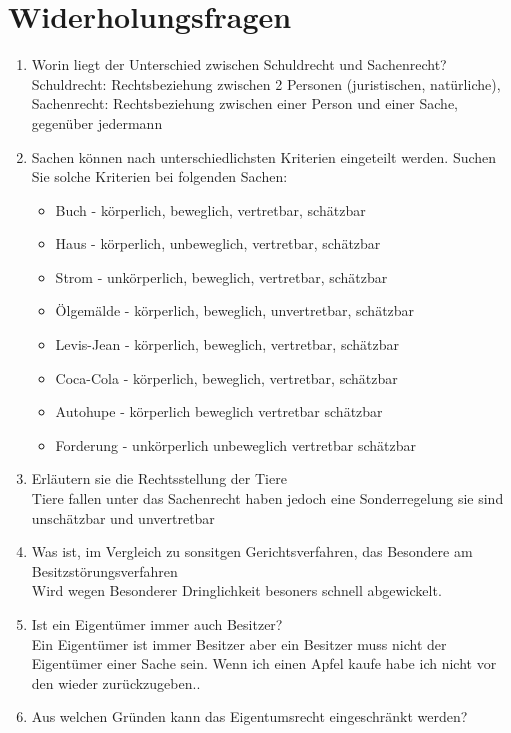 \documentclass[a4paper]{report}
\begin{document}
\section{Widerholungsfragen}
\begin{enumerate}
\item Worin liegt der Unterschied zwischen Schuldrecht und Sachenrecht?\\
Schuldrecht: Rechtsbeziehung zwischen 2 Personen (juristischen, natürliche), Sachenrecht: Rechtsbeziehung zwischen einer Person und einer Sache, gegenüber jedermann
\item Sachen können nach unterschiedlichsten Kriterien eingeteilt werden. Suchen Sie solche Kriterien bei folgenden Sachen:\\
\begin{itemize}
\item Buch - körperlich, beweglich, vertretbar, schätzbar
\item Haus - körperlich, unbeweglich, vertretbar, schätzbar
\item Strom - unkörperlich, beweglich, vertretbar, schätzbar
\item Ölgemälde - körperlich, beweglich, unvertretbar, schätzbar
\item Levis-Jean - körperlich, beweglich, vertretbar, schätzbar
\item Coca-Cola - körperlich, beweglich, vertretbar, schätzbar
\item Autohupe - körperlich beweglich vertretbar schätzbar
\item Forderung - unkörperlich unbeweglich vertretbar schätzbar
\end{itemize}
\item Erläutern sie die Rechtsstellung der Tiere\\
Tiere fallen unter das Sachenrecht haben jedoch eine Sonderregelung sie sind unschätzbar und unvertretbar
\item Was ist, im Vergleich zu sonsitgen Gerichtsverfahren, das Besondere am Besitzstörungsverfahren\\
Wird wegen Besonderer Dringlichkeit besoners schnell abgewickelt.
\item Ist ein Eigentümer immer auch Besitzer?\\
Ein Eigentümer ist immer Besitzer aber ein Besitzer muss nicht der Eigentümer einer Sache sein. Wenn ich einen Apfel kaufe habe ich nicht vor den wieder zurückzugeben..
\item Aus welchen Gründen kann das Eigentumsrecht eingeschränkt werden?\\

\end{enumerate}
\end{document}
